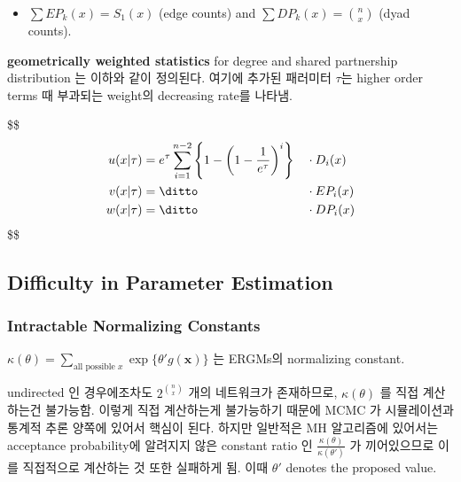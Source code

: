 \documentclass[
]{book}
\providecommand{\tightlist}{%
  \setlength{\itemsep}{0pt}\setlength{\parskip}{0pt}}
\begin{document}
{{{\begin{itemize}
\begin{itemize}
    \begin{itemize}
    \tightlist
    \item
      \(EP_k (x)\): \(X_{ij} = 1\)
    \item
      \(NP_k (x)\): \(X_{ij} = 0\)
    \item
      \(DP_k (x)\): regardless of value \(X_{ij}\)
    \end{itemize}
  \item
    \(\sum EP_k(x) = S_1(x)\) (edge counts) and \(\sum DP_k (x) = {n \choose x}\) (dyad counts).
  \end{itemize}
\end{itemize}

\textbf{geometrically weighted statistics} for degree and shared partnership distribution 는 이하와 같이 정의된다. 여기에 추가된 패러미터 \(\tau\)는 higher order terms 때 부과되는 weight의 decreasing rate를 나타냄.

\$\$
\begin{alignat}{2}

u(x | \tau) 
&= e^\tau \sum_{i=1}^{n-2} \left \{ 1- \left ( 1-\frac{1}{e^\tau} \right)^i \right \} 
&&\cdot D_i(x)

\\

v(x | \tau) 
&= \ditto
&&\cdot EP_i(x)

\\

w(x | \tau) 
&= \ditto
&&\cdot DP_i(x)

\end{alignat}
\$\$

\hypertarget{difficulty-in-parameter-estimation}{%
\subsection{Difficulty in Parameter Estimation}\label{difficulty-in-parameter-estimation}}

\hypertarget{intractable-normalizing-constants}{%
\subsubsection{Intractable Normalizing Constants}\label{intractable-normalizing-constants}}

\(\kappa (\theta) =\sum_{\text{all possible }x} \exp \Big \{ \theta' g(\mathbf x) \Big \}\) 는 ERGMs의 normalizing constant.

undirected 인 경우에조차도 \(2^{n \choose x}\) 개의 네트워크가 존재하므로, \(\kappa(\theta)\) 를 직접 계산하는건 불가능함. 이렇게 직접 계산하는게 불가능하기 때문에 MCMC 가 시뮬레이션과 통계적 추론 양쪽에 있어서 핵심이 된다. 하지만 일반적은 MH 알고리즘에 있어서는 acceptance probability에 알려지지 않은 constant ratio 인 \(\frac{\kappa(\theta)}{\kappa(\theta')}\) 가 끼어있으므로 이를 직접적으로 계산하는 것 또한 실패하게 됨. 이때 \(\theta '\) denotes the proposed value.

}}}
\end{document}

